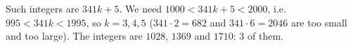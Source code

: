 Such integers are $341k+5$. We need $1000<341k+5<2000$, i.e. $995<341k<1995$, so $k=3,4,5$ ($341\cdot2=682$ and $341\cdot6=2046$ are too small and too large). The integers are $1028$, $1369$ and $1710$: $\boxed{3}$ of them.
